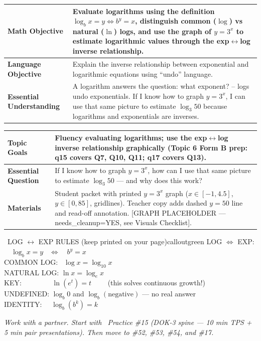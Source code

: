 \documentclass[11pt]{article}
\newcommand{\lessonrow}[2]{\textbf{#1} & #2 \\ \hline}
\newcommand{\rulescardcontent}{%
LOG \(\Leftrightarrow\) EXP: \ \ \(\log_b x = y\) \ \(\Leftrightarrow\)\ \ \(b^y = x\)\\
COMMON LOG: \ \(\log x = \log_{10} x\)\\
NATURAL LOG: \(\ln x = \log_e x\)\\
KEY: \ \ \ \ \ \ \ \ \(\ln(e^t) = t\) \ \ \ \ (this solves continuous growth!)\\
UNDEFINED: \(\log_b 0\) and \(\log_b(\text{negative})\) --- no real answer\\
IDENTITY: \ \ \(\log_b(b^k) = k\)%
}
\begin{document}

{\small
\renewcommand{\arraystretch}{1.25}
\noindent\begin{tabular}{|p{1.8in}|p{4.8in}|}
\hline
\lessonrow{Math Objective}{Evaluate logarithms using the definition \(\log_b x = y \Leftrightarrow b^y = x\), distinguish common (\(\log\)) vs natural (\(\ln\)) logs, and use the graph of \(y=3^x\) to estimate logarithmic values through the exp\(\leftrightarrow\)log inverse relationship.}
\lessonrow{Language Objective}{Explain the inverse relationship between exponential and logarithmic equations using ``undo'' language.}
\lessonrow{Essential Understanding}{A logarithm answers the question: what exponent? -- logs undo exponentials. If I know how to graph \(y = 3^x\), I can use that same picture to estimate \(\log_3 50\) because logarithms and exponentials are inverses.}
\end{tabular}
}

{\small
\renewcommand{\arraystretch}{1.25}
\noindent\begin{tabular}{|p{1.8in}|p{4.8in}|}
\hline
\lessonrow{Topic Goals}{Fluency evaluating logarithms; use the exp\(\leftrightarrow\)log inverse relationship graphically (Topic 6 Form B prep: q15 covers Q7, Q10, Q11; q17 covers Q13).}
\lessonrow{Essential Question}{If I know how to graph \(y = 3^x\), how can I use that same picture to estimate \(\log_3 50\) --- and why does this work?}
\lessonrow{Materials}{Student packet with printed \(y=3^x\) graph (\(x \in [-1, 4.5]\), \(y \in [0, 85]\), gridlines). Teacher copy adds dashed \(y=50\) line and read-off annotation. [GRAPH PLACEHOLDER --- needs\_cleanup=YES, see Visuals Checklist].}
\end{tabular}
}


\begin{callout}{\IconBook\ LOG \(\leftrightarrow\) EXP RULES (keep printed on your page)}{calloutgreen}
\rulescardcontent
\end{callout}

\textit{Work with a partner. Start with \IconStar\ Practice \#15 (DOK-3 spine --- 10 min TPS + 5 min pair presentations). Then move to \#52, \#53, \#54, and \#17.}
\end{document}
